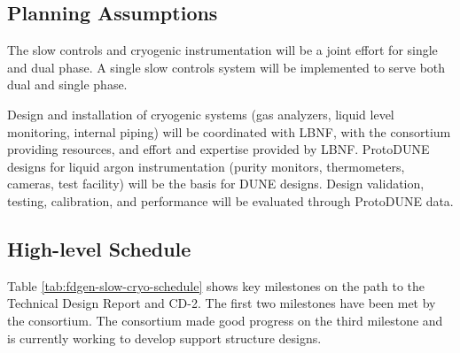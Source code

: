 \subsection{Planning Assumptions}
\label{sec:fdgen-slow-cryo-org-assmp}

The slow controls and cryogenic instrumentation will be a joint effort for single and dual phase.
A single slow controls system will be implemented to serve both dual and single phase.

Design and installation of cryogenic systems (gas analyzers, liquid level monitoring, internal piping) will be coordinated with LBNF, with the consortium providing resources, and effort and expertise provided by LBNF.
ProtoDUNE designs for liquid argon instrumentation (purity monitors, thermometers, cameras, test facility) will be the basis for DUNE designs. Design validation, testing, calibration, and performance will be evaluated through ProtoDUNE data.



\subsection{High-level Schedule}
\label{sec:fdgen-slow-cryo-org-cs}

Table \ref{tab:fdgen-slow-cryo-schedule} shows key milestones on
the path to the Technical Design Report and CD-2. The first two milestones have been met by the consortium.
The consortium made good progress on the third milestone and is currently working to develop support structure designs.

